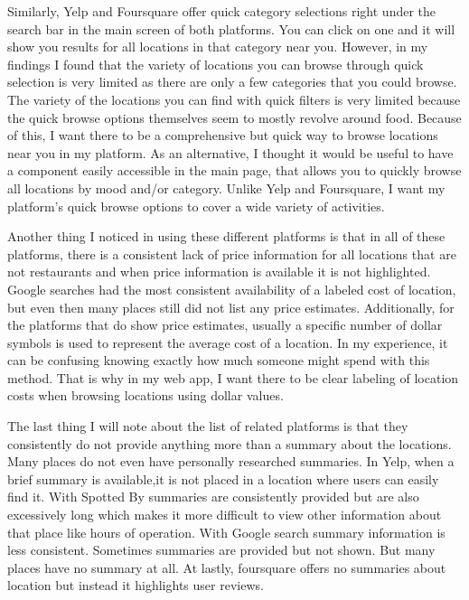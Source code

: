 \documentclass[12pt,twocolumn]{article}
\begin{document}
Similarly, Yelp and Foursquare offer quick category selections right under the search bar in the main screen of both platforms. You can click on one and it will show you results for all locations in that category near you. However, in my findings I found that the variety of locations you can browse through quick selection is very limited as there are only a few categories that you could browse. The variety of the locations you can find with quick filters is very limited  because the quick browse options themselves seem to mostly revolve around food. Because of this, I want there to be a comprehensive but quick way to browse locations near you in my platform. As an alternative, I thought it would be useful to have a component easily accessible in the main page, that allows you to quickly browse all locations by mood and/or category. Unlike Yelp and Foursquare, I want my platform’s quick browse options to cover a wide variety of activities.


Another thing I noticed in using these different platforms is that  in all of these platforms, there is a consistent lack of  price information for all locations that are not restaurants and when price information is available it is not highlighted. Google searches had the most consistent availability of a labeled cost of location, but even then many places still did not list any price estimates. Additionally, for the platforms that do show price estimates, usually a specific number of dollar symbols is used to represent the average cost of a location. In my experience, it can be confusing knowing exactly how much someone might spend with this method. That is why in my web app, I want there to be clear labeling of location costs when browsing locations using dollar values. 

The last thing I will note about the list of related platforms is that they consistently do not provide anything more than a summary about the locations. Many places do not even have personally researched summaries. In Yelp, when a brief summary is available,it is not placed in a location where users can easily find it. With Spotted By summaries are consistently provided but are also excessively long which makes it more difficult to view other information about that place like hours of operation. With Google search summary information is less consistent. Sometimes summaries are provided but not shown. But many places have no summary at all. At lastly, foursquare offers no summaries about location but instead it highlights user reviews. 
\end{document}
